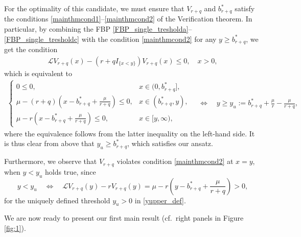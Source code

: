 \documentclass[11pt]{article} %
\numberwithin{komcounter}{section}
\numberwithin{equation}{section}
\numberwithin{theorem}{section}
\begin{document}
For the optimality of this candidate, we must ensure that $V_{r+q}$ and $b_{r+q}^*$ satisfy the conditions \eqref{mainthmcond1}--\eqref{mainthmcond2} of the Verification theorem.
In particular, by combining the FBP \eqref{FBP_single_tresholda}--\eqref{FBP_single_tresholdc} with the condition \eqref{mainthmcond2} for any $y \geq b_{r+q}^*$, we get the condition
\begin{align*}
\mathcal{L}V_{r+q}(x) - (r+q I_{\{x<y\}}) V_{r+q}(x) \leq 0, \quad x > 0,
\end{align*}
which is equivalent to
\begin{align} \label{yupper_def}
\begin{cases}
0\leq 0, & x \in (0,b^*_{r+q}], \\
\mu - (r+q) (x - b^*_{r+q} + \frac{\mu}{r+q})  \leq 0, & x \in (b^*_{r+q},y), \\
\mu - r (x - b^*_{r+q} + \frac{\mu}{r+q})  \leq 0, & x \in [y,\infty),
\end{cases} 
\quad \Leftrightarrow \quad 
y \geq y_u := b^*_{r+q} + \frac{\mu}r - \frac{\mu}{r+q},
\end{align}
where the equivalence follows from the latter inequality on the left-hand side.
It is thus clear from above that $y_u\geq b_{r+q}^*$, which satisfies our ansatz. 

Furthermore, we observe that $V_{r+q}$ violates condition \eqref{mainthmcond2} at $x=y$, when $y < y_u$ holds true, since 
\begin{equation} \label{Wy}
y < y_u
\quad \Leftrightarrow \quad 
\mathcal{L}V_{r+q}(y) - r V_{r+q}(y) = \mu - r (y - b^*_{r+q} + \frac{\mu}{r+q}) > 0, 
\end{equation}
for the uniquely defined threshold $y_u > 0$ in \eqref{yupper_def}. 

We are now ready to present our first main result 
(cf.~right panels in Figure \ref{fig:1}).
\end{document}
